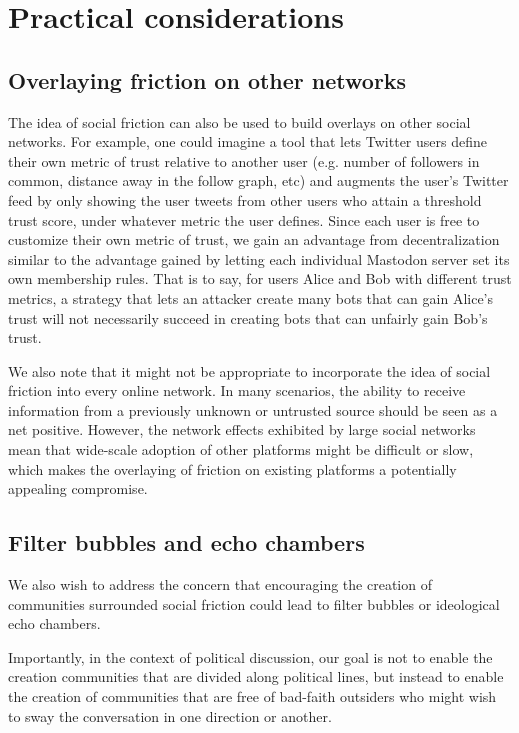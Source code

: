 \documentclass[sigconf,authordraft]{acmart}
\begin{document}
\section{Practical considerations}

\subsection{Overlaying friction on other networks}

The idea of social friction can also be used to build overlays on other social networks. For example, one could imagine a tool that lets Twitter users define their own metric of trust relative to another user (e.g. number of followers in common, distance away in the follow graph, etc) and augments the user's Twitter feed by only showing the user tweets from other users who attain a threshold trust score, under whatever metric the user defines. Since each user is free to customize their own metric of trust, we gain an advantage from decentralization similar to the advantage gained by letting each individual Mastodon server set its own membership rules. That is to say, for users Alice and Bob with different trust metrics, a strategy that lets an attacker create many bots that can gain Alice's trust will not necessarily succeed in creating bots that can unfairly gain Bob's trust.

We also note that it might not be appropriate to incorporate the idea of social friction into every online network. In many scenarios, the ability to receive information from a previously unknown or untrusted source should be seen as a net positive. However, the network effects \cite{katz1994systems} exhibited by large social networks mean that wide-scale adoption of other platforms might be difficult or slow, which makes the overlaying of friction on existing platforms a potentially appealing compromise.  

\subsection{Filter bubbles and echo chambers}

We also wish to address the concern that encouraging the creation of communities surrounded social friction could lead to filter bubbles \cite{pariser2011filter} or ideological echo chambers. 

Importantly, in the context of political discussion, our goal is not to enable the creation communities that are divided along political lines, but instead to enable the creation of communities that are free of bad-faith outsiders who might wish to sway the conversation in one direction or another. 
\end{document}
